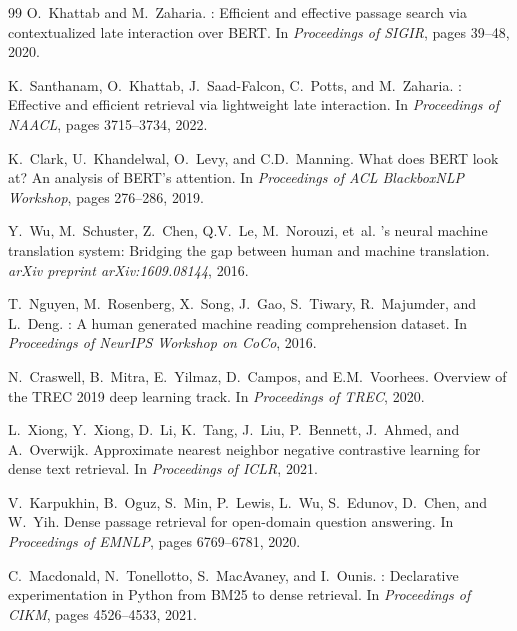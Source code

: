 \documentclass[11pt,a4paper]{article}
\theoremstyle{definition}
\theoremstyle{plain}
\begin{document}
\begin{thebibliography}{99}
O.~Khattab and M.~Zaharia.
: Efficient and effective passage search via contextualized late interaction over {BERT}.
\newblock In \emph{Proceedings of SIGIR}, pages 39--48, 2020.

K.~Santhanam, O.~Khattab, J.~Saad-Falcon, C.~Potts, and M.~Zaharia.
: Effective and efficient retrieval via lightweight late interaction.
\newblock In \emph{Proceedings of NAACL}, pages 3715--3734, 2022.

K.~Clark, U.~Khandelwal, O.~Levy, and C.D.~Manning.
\newblock What does {BERT} look at? {An} analysis of {BERT}'s attention.
\newblock In \emph{Proceedings of ACL BlackboxNLP Workshop}, pages 276--286, 2019.

Y.~Wu, M.~Schuster, Z.~Chen, Q.V.~Le, M.~Norouzi, et~al.
's neural machine translation system: Bridging the gap between human and machine translation.
\newblock \emph{arXiv preprint arXiv:1609.08144}, 2016.

T.~Nguyen, M.~Rosenberg, X.~Song, J.~Gao, S.~Tiwary, R.~Majumder, and L.~Deng.
: A human generated machine reading comprehension dataset.
\newblock In \emph{Proceedings of NeurIPS Workshop on CoCo}, 2016.

N.~Craswell, B.~Mitra, E.~Yilmaz, D.~Campos, and E.M.~Voorhees.
\newblock Overview of the {TREC} 2019 deep learning track.
\newblock In \emph{Proceedings of TREC}, 2020.

L.~Xiong, Y.~Xiong, D.~Li, K.~Tang, J.~Liu, P.~Bennett, J.~Ahmed, and A.~Overwijk.
\newblock Approximate nearest neighbor negative contrastive learning for dense text retrieval.
\newblock In \emph{Proceedings of ICLR}, 2021.

V.~Karpukhin, B.~Oguz, S.~Min, P.~Lewis, L.~Wu, S.~Edunov, D.~Chen, and W.~Yih.
\newblock Dense passage retrieval for open-domain question answering.
\newblock In \emph{Proceedings of EMNLP}, pages 6769--6781, 2020.

C.~Macdonald, N.~Tonellotto, S.~MacAvaney, and I.~Ounis.
: Declarative experimentation in {Python} from {BM25} to dense retrieval.
\newblock In \emph{Proceedings of CIKM}, pages 4526--4533, 2021.

\end{thebibliography}
\end{document}
